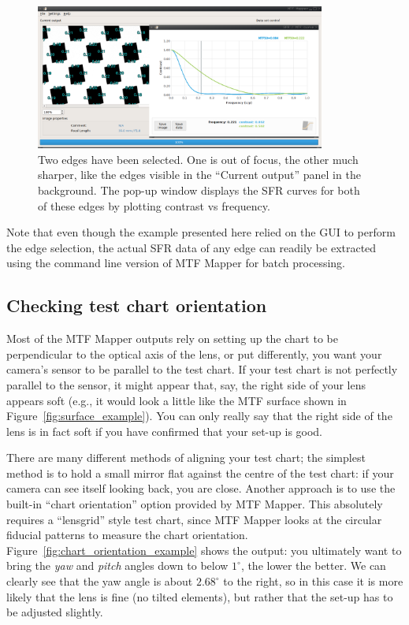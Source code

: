\documentclass[a4paper]{article}
\begin{document}
\begin{figure}[!ht]
\centering
\includegraphics[width=0.85\textwidth]{figures/sfr_example}
\caption{Two edges have been selected. One is out of focus, the other much
sharper, like the edges visible in the ``Current output'' panel in the
background. The pop-up window displays the SFR curves for both of these
edges by plotting contrast vs frequency.}
\label{fig:sfr_example}
\end{figure}

Note that even though the example presented here relied on the GUI to
perform the edge selection, the actual SFR data of any edge can readily be
extracted using the command line version of MTF Mapper for batch processing.


\subsection{Checking test chart orientation}
\label{sec:chart_orientation}
Most of the MTF Mapper outputs rely on setting up the chart to be
perpendicular to the optical axis of the lens, or put differently, you want
your camera's sensor to be parallel to the test chart. If your test chart is not
perfectly parallel to the sensor, it might appear that, say, the right side of
your lens appears soft (e.g., it would look a little like the MTF surface
shown in Figure~\ref{fig:surface_example}). You can only really say that the
right side of the lens is in fact soft if you have confirmed that your
set-up is good.

There are many different methods of aligning your test chart; the simplest
method is to hold a small mirror flat against the centre of the test chart: if your camera
can see itself looking back, you are close. Another approach is to use the
built-in ``chart orientation'' option provided by MTF Mapper. This
absolutely requires a ``lensgrid'' style test chart, since MTF Mapper looks
at the circular fiducial patterns to measure the chart orientation.
Figure~\ref{fig:chart_orientation_example} shows the output: you ultimately
want to bring the \emph{yaw} and \emph{pitch} angles down to below
$1^\circ$, the lower the better. We can clearly see that the yaw angle is
about $2.68^\circ$ to the right, so in this case it is more likely that the
lens is fine (no tilted elements), but rather that the set-up has to be
adjusted slightly.
\end{document}
